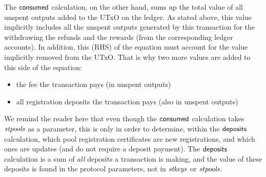 \documentclass[11pt,a4paper,dvipsnames]{article}
\theoremstyle{definition}
\theoremstyle{definition}
\begin{document}
The $\mathsf{consumed}$ calculation, on the other hand, sums up the total
value of all unspent outputs added to the UTxO on the ledger. As stated
above, this value implicitly includes all the unspent outputs generated
by this transaction for the withdrawing the refunds and the rewards
(from the corresponding ledger accounts). In addition, this (RHS) of the
equation must account for the value implicitly removed from the UTxO. That is why
two more values are added to this side of the equation:

\begin{itemize}
\item the fee the transaction pays (in unspent outputs)
\item all registration
deposits the transaction pays (also in unspent outputs)
\end{itemize}

We remind the reader here that even though the $\mathsf{consumed}$ calculation
takes $\mathit{stpools}$ as a parameter, this is only in order to determine,
within the $\mathsf{deposits}$ calculation, which
pool registration certificates are new registrations, and which ones are updates
(and do not require a deposit payment). The $\mathsf{deposits}$ calculation is
a sum of \textit{all} deposits a transaction is making, and the value of these
deposits is found in the protocol parameters, not in $\mathit{stkeys}$ or $\mathit{stpools}$.
\end{document}
